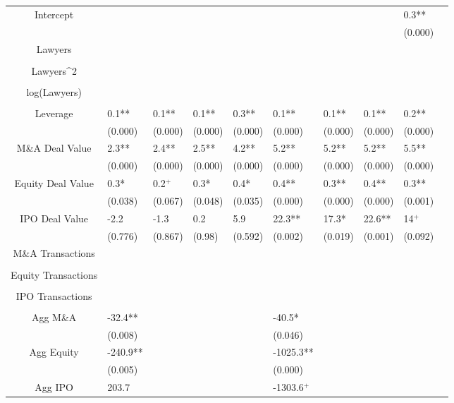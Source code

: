 \documentclass{article}
\begin{document}
\begin{table}[H]
\begin{tabular}{|clllllllll|}
Intercept &  &  &  &  &  &  &  & 0.3** & \\ 
   &  &  &  &  &  &  &  & (0.000) & \\ 
  Lawyers &  &  &  &  &  &  &  &  & \\ 
   &  &  &  &  &  &  &  &  & \\ 
  Lawyers^2 &  &  &  &  &  &  &  &  & \\ 
   &  &  &  &  &  &  &  &  & \\ 
  log(Lawyers) &  &  &  &  &  &  &  &  & \\ 
   &  &  &  &  &  &  &  &  & \\ 
  Leverage & 0.1** & 0.1** & 0.1** & 0.3** & 0.1** & 0.1** & 0.1** & 0.2** & \\ 
   & (0.000) & (0.000) & (0.000) & (0.000) & (0.000) & (0.000) & (0.000) & (0.000) & \\ 
  M\&A Deal Value & 2.3** & 2.4** & 2.5** & 4.2** & 5.2** & 5.2** & 5.2** & 5.5** & \\ 
   & (0.000) & (0.000) & (0.000) & (0.000) & (0.000) & (0.000) & (0.000) & (0.000) & \\ 
  Equity Deal Value & 0.3* & 0.2$^{+}$ & 0.3* & 0.4* & 0.4** & 0.3** & 0.4** & 0.3** & \\ 
   & (0.038) & (0.067) & (0.048) & (0.035) & (0.000) & (0.000) & (0.000) & (0.001) & \\ 
  IPO Deal Value & -2.2 & -1.3 & 0.2 & 5.9 & 22.3** & 17.3* & 22.6** & 14$^{+}$ & \\ 
   & (0.776) & (0.867) & (0.98) & (0.592) & (0.002) & (0.019) & (0.001) & (0.092) & \\ 
  M\&A Transactions &  &  &  &  &  &  &  &  & \\ 
   &  &  &  &  &  &  &  &  & \\ 
  Equity Transactions &  &  &  &  &  &  &  &  & \\ 
   &  &  &  &  &  &  &  &  & \\ 
  IPO Transactions &  &  &  &  &  &  &  &  & \\ 
   &  &  &  &  &  &  &  &  & \\ 
  Agg M\&A & -32.4** &  &  &  & -40.5* &  &  &  & \\ 
   & (0.008) &  &  &  & (0.046) &  &  &  & \\ 
  Agg Equity & -240.9** &  &  &  & -1025.3** &  &  &  & \\ 
   & (0.005) &  &  &  & (0.000) &  &  &  & \\ 
  Agg IPO & 203.7 &  &  &  & -1303.6$^{+}$ &  &  &  & \\ 

\end{tabular}
\end{table}
\end{document}
